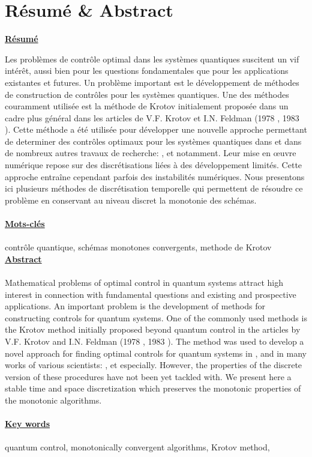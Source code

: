 \chapter*{Résumé \& Abstract}
\Large
\begin{flushleft}
\textbf{\underline{Résumé}}
\end{flushleft}
\normalsize
Les problèmes de contrôle optimal dans les systèmes quantiques suscitent un vif intérêt, aussi bien pour les questions fondamentales que pour les applications existantes et futures. Un problème important est le développement de méthodes de construction de contrôles pour les systèmes quantiques. Une des méthodes couramment utilisée est la méthode de Krotov initialement proposée dans un cadre plus général dans les articles de V.F. Krotov et I.N. Feldman (1978 \cite{Krotov1}, 1983 \cite{Krotov2}). Cette méthode a été utilisée pour développer une nouvelle approche permettant de determiner des contrôles optimaux pour les systèmes quantiques dans \cite{Tannor} et dans de nombreux autres travaux de recherche: \cite{Zhu}, \cite{Maday} et \cite{Salomon} notamment. Leur mise en œuvre numérique repose sur des discrétisations liées à des développement limités. Cette approche entraîne cependant parfois des instabilités numériques. Nous presentons ici plusieurs méthodes de discrétisation temporelle qui permettent de résoudre ce problème en conservant au niveau discret la monotonie des schémas.\\\\
\Large\textbf{\underline{Mots-clés}}\normalsize\\\\
contrôle quantique, schémas monotones convergents, methode de Krotov
\[\]
\Large\textbf{\underline{Abstract}}\\\\\normalsize
Mathematical problems of optimal control in quantum systems attract high interest in connection with fundamental questions and existing and prospective applications. An important problem is the development of methods for constructing controls for quantum systems. One of the commonly used methods is the Krotov method initially proposed beyond quantum control in the articles by V.F. Krotov and I.N. Feldman (1978 \cite{Krotov1}, 1983 \cite{Krotov2}). The method was used to develop a novel approach for finding optimal controls for quantum systems in \cite{Tannor}, and in many works of various scientists: \cite{Zhu}, \cite{Maday} et \cite{Salomon} especially. However, the properties of the discrete version of these procedures have not been yet tackled with.
We present here a stable time and space discretization which preserves the
monotonic properties of the monotonic algorithms.\\\\
\Large\textbf{\underline{Key words}}\normalsize\\\\
quantum control, monotonically convergent algorithms, Krotov method,
